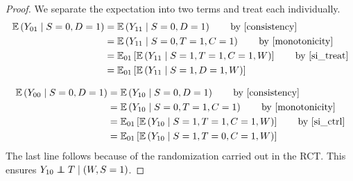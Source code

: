 \documentclass{article}
\newcommand{\ex}{\mathbb{E}} %
\newcommand\independent{\protect\mathpalette{\protect\independenT}{\perp}}
\def\independenT#1#2{\mathrel{\rlap{$#1#2$}\mkern2mu{#1#2}}}
\theoremstyle{plain}
\begin{document}
\begin{proof}
We separate the expectation into two terms and treat each individually.
\begin{align*}
\ex\left(Y_{01} \mid S=0,D=1\right) &= \ex\left(Y_{11} \mid S=0, D=1\right) \tag*{by \eqref{consistency}} \\
&= \ex\left(Y_{11} \mid S=0, T=1, C=1\right) \tag*{by \eqref{monotonicity}} \\
&= \ex_{01}\left[  \ex\left(Y_{11} \mid S=1, T=1, C=1, W\right) \right] \tag*{by \eqref{si_treat}} \\
&= \ex_{01}\left[  \ex\left(Y_{11} \mid S=1, D=1, W\right)\right]
\end{align*}


\begin{align*}
\ex\left(Y_{00} \mid S=0, D=1\right) &= \ex\left(Y_{10} \mid S=0, D=1\right) \tag*{by \eqref{consistency}} \\
&= \ex\left(Y_{10} \mid S=0, T=1, C=1\right) \tag*{by \eqref{monotonicity}} \\
&= \ex_{01}\left[  \ex\left(Y_{10} \mid S=1, T=1, C=1, W\right) \right] \tag*{by \eqref{si_ctrl}} \\
&= \ex_{01}\left[  \ex\left(Y_{10} \mid S=1, T=0, C=1, W\right) \right] \\
\end{align*}
The last line follows because of the randomization carried out in the RCT.  This ensures $Y_{10} \independent T \mid (W, S=1)$.
\end{proof}
\end{document}
